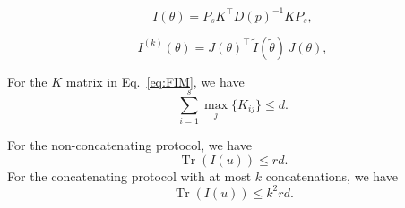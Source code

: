 \documentclass[10pt,a4paper]{amsart}
\begin{document}
\begin{equation}\label{eq:FIM}
    I(\theta) = P_s K^\top D(p)^{-1} K P_s,
\end{equation}

\begin{equation}\label{eq:concFI}
    I^{(k)}(\theta)
    = J(\theta)^{\top} \, \tilde{I}(\tilde{\theta}) \, J(\theta),
\end{equation}

\begin{lemma}\label{lm:suc}
For the $K$ matrix in Eq.~\ref{eq:FIM}, we have
\begin{equation}
    \sum_{i=1}^s \max_j \{K_{ij}\} \leq d.
\end{equation}
\end{lemma}

\begin{theorem}\label{th:trFI}
For the non-concatenating protocol, we have
\begin{equation}\label{eq:trInonc}
    \operatorname{Tr}(I(u)) \le r d.
\end{equation}
For the concatenating protocol with at most $k$ concatenations, we have
\begin{equation}\label{eq:trIc}
    \operatorname{Tr}(I(u)) \le k^2 r d.
\end{equation}
\end{theorem}
\end{document}
